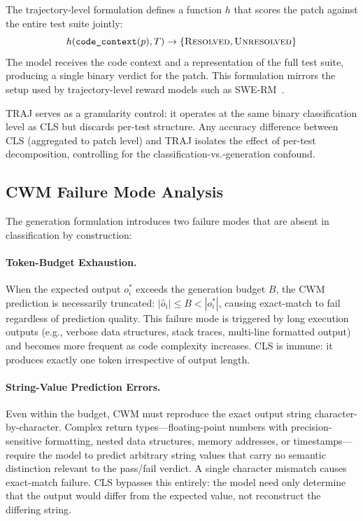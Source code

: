 The trajectory-level formulation defines a function $h$ that scores the patch against the entire test suite jointly:
\begin{equation}
    h(\texttt{code\_context}(p), T) \rightarrow \{\textsc{Resolved}, \textsc{Unresolved}\}
    \label{eq:traj}
\end{equation}
The model receives the code context and a representation of the full test suite, producing a single binary verdict for the patch. This formulation mirrors the setup used by trajectory-level reward models such as SWE-RM~\cite{shum2025swerm}.

TRAJ serves as a granularity control: it operates at the same binary classification level as CLS but discards per-test structure. Any accuracy difference between CLS (aggregated to patch level) and TRAJ isolates the effect of per-test decomposition, controlling for the classification-vs.-generation confound.

\subsection{CWM Failure Mode Analysis}
\label{ssec:failure_modes}

The generation formulation introduces two failure modes that are absent in classification by construction:

\paragraph{Token-Budget Exhaustion.}
When the expected output $o_i^*$ exceeds the generation budget $B$, the CWM prediction is necessarily truncated: $|\hat{o}_i| \leq B < |o_i^*|$, causing exact-match to fail regardless of prediction quality. This failure mode is triggered by long execution outputs (e.g., verbose data structures, stack traces, multi-line formatted output) and becomes more frequent as code complexity increases. CLS is immune: it produces exactly one token irrespective of output length.

\paragraph{String-Value Prediction Errors.}
Even within the budget, CWM must reproduce the exact output string character-by-character. Complex return types---floating-point numbers with precision-sensitive formatting, nested data structures, memory addresses, or timestamps---require the model to predict arbitrary string values that carry no semantic distinction relevant to the pass/fail verdict. A single character mismatch causes exact-match failure. CLS bypasses this entirely: the model need only determine that the output would differ from the expected value, not reconstruct the differing string.

